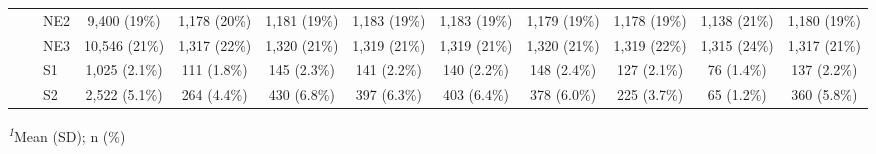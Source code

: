 \begin{longtable}{lccccccccc}
    NE2 & 9,400 (19\%) & 1,178 (20\%) & 1,181 (19\%) & 1,183 (19\%) & 1,183 (19\%) & 1,179 (19\%) & 1,178 (19\%) & 1,138 (21\%) & 1,180 (19\%) \\ 
    NE3 & 10,546 (21\%) & 1,317 (22\%) & 1,320 (21\%) & 1,319 (21\%) & 1,319 (21\%) & 1,320 (21\%) & 1,319 (22\%) & 1,315 (24\%) & 1,317 (21\%) \\ 
    S1 & 1,025 (2.1\%) & 111 (1.8\%) & 145 (2.3\%) & 141 (2.2\%) & 140 (2.2\%) & 148 (2.4\%) & 127 (2.1\%) & 76 (1.4\%) & 137 (2.2\%) \\ 
    S2 & 2,522 (5.1\%) & 264 (4.4\%) & 430 (6.8\%) & 397 (6.3\%) & 403 (6.4\%) & 378 (6.0\%) & 225 (3.7\%) & 65 (1.2\%) & 360 (5.8\%) \\ 
\bottomrule
\end{longtable}
\begin{minipage}{\linewidth}
\textsuperscript{\textit{1}}Mean (SD); n (\%)\\
\end{minipage}
\endgroup

